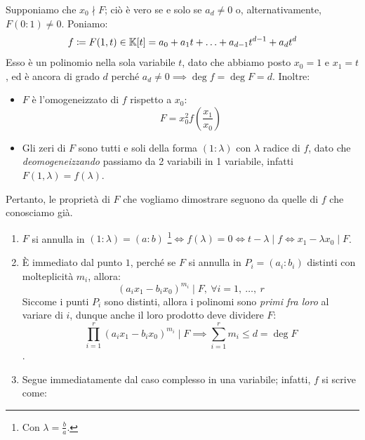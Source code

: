 \begin{demonstration}
	Supponiamo che $x_0 \nmid F$; ciò è vero se e solo se $a_d\neq 0$ o, alternativamente, $F(0\colon 1)\neq 0$. Poniamo:
	\begin{equation}
		f\coloneqq F(1,t)\in\mathbb{K}[t] = a_0+a_1t+\ldots+a_{d-1}t^{d-1}+a_dt^d
	\end{equation}
	Esso è un polinomio nella sola variabile $t$, dato che abbiamo posto $x_0=1$ e $x_1=t$, ed è ancora di grado $d$ perché $a_d\neq 0\implies \deg f=\deg F=d$. Inoltre:
		\begin{itemize}
			\item $F$ è l'omogeneizzato di $f$ rispetto a $x_0$:
			\begin{equation*}
				F=x_0^2f\left( \frac{x_1}{x_0} \right)
			\end{equation*}
			\item Gli zeri di $F$ sono tutti e soli della forma $(1\colon\lambda)$ con $\lambda$ radice di $f$, dato che \textit{deomogeneizzando} passiamo da 2 variabili in 1 variabile, infatti $F(1,\lambda)=f(\lambda)$.
		\end{itemize}
	Pertanto, le proprietà di $F$ che vogliamo dimostrare seguono da quelle di $f$ che conosciamo già.
		\begin{enumerate}[label=\Roman*]
			\item $F$ si annulla in $(1\colon\lambda)=(a\colon b)$ \footnote{Con $\lambda=\frac{b}{a}$.}$\iff f(\lambda)=0 \iff t-\lambda \mid f \iff x_1-\lambda x_0\mid F$. %
			\item È immediato dal punto $1$, perché se $F$ si annulla in $P_i=(a_i\colon b_i)$ distinti con molteplicità $m_i$, allora:
			\begin{equation*}
				(a_ix_1-b_ix_0)^{m_i} \mid F,\ \forall i=1,\ \ldots,\ r 
			\end{equation*}
			Siccome i punti $P_i$ sono distinti, allora i polinomi sono \textit{primi fra loro} al variare di $i$, dunque anche il loro prodotto deve dividere $F$:
			 \begin{equation*}
			 	\prod_{i=1}^r (a_ix_1-b_ix_0)^{m_i}\mid F \implies \sum_{i=1}^r m_i\leq d=\deg F
			 \end{equation*}.
			\item Segue immediatamente dal caso complesso in una variabile; infatti, $f$ si scrive come:
			\begin{equation*}

\end{equation*}
\end{enumerate}
\end{demonstration}
